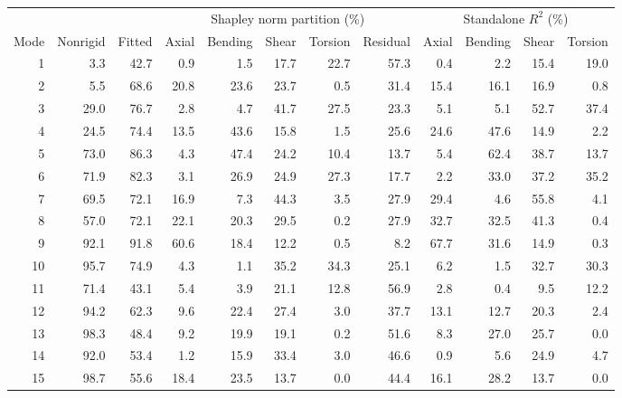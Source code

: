 \begin{tabular}{rrrrrrrrrrrr}
\toprule
 & & & \multicolumn{5}{c}{Shapley norm partition (\%)} & \multicolumn{4}{c}{Standalone $R^2$ (\%)} \\
\cmidrule(lr){4-8} \cmidrule(lr){9-12}
Mode & Nonrigid & Fitted & Axial & Bending & Shear & Torsion & Residual & Axial & Bending & Shear & Torsion \\
\midrule
1 & 3.3 & 42.7 & 0.9 & 1.5 & 17.7 & 22.7 & 57.3 & 0.4 & 2.2 & 15.4 & 19.0 \\
2 & 5.5 & 68.6 & 20.8 & 23.6 & 23.7 & 0.5 & 31.4 & 15.4 & 16.1 & 16.9 & 0.8 \\
3 & 29.0 & 76.7 & 2.8 & 4.7 & 41.7 & 27.5 & 23.3 & 5.1 & 5.1 & 52.7 & 37.4 \\
4 & 24.5 & 74.4 & 13.5 & 43.6 & 15.8 & 1.5 & 25.6 & 24.6 & 47.6 & 14.9 & 2.2 \\
5 & 73.0 & 86.3 & 4.3 & 47.4 & 24.2 & 10.4 & 13.7 & 5.4 & 62.4 & 38.7 & 13.7 \\
6 & 71.9 & 82.3 & 3.1 & 26.9 & 24.9 & 27.3 & 17.7 & 2.2 & 33.0 & 37.2 & 35.2 \\
7 & 69.5 & 72.1 & 16.9 & 7.3 & 44.3 & 3.5 & 27.9 & 29.4 & 4.6 & 55.8 & 4.1 \\
8 & 57.0 & 72.1 & 22.1 & 20.3 & 29.5 & 0.2 & 27.9 & 32.7 & 32.5 & 41.3 & 0.4 \\
9 & 92.1 & 91.8 & 60.6 & 18.4 & 12.2 & 0.5 & 8.2 & 67.7 & 31.6 & 14.9 & 0.3 \\
10 & 95.7 & 74.9 & 4.3 & 1.1 & 35.2 & 34.3 & 25.1 & 6.2 & 1.5 & 32.7 & 30.3 \\
11 & 71.4 & 43.1 & 5.4 & 3.9 & 21.1 & 12.8 & 56.9 & 2.8 & 0.4 & 9.5 & 12.2 \\
12 & 94.2 & 62.3 & 9.6 & 22.4 & 27.4 & 3.0 & 37.7 & 13.1 & 12.7 & 20.3 & 2.4 \\
13 & 98.3 & 48.4 & 9.2 & 19.9 & 19.1 & 0.2 & 51.6 & 8.3 & 27.0 & 25.7 & 0.0 \\
14 & 92.0 & 53.4 & 1.2 & 15.9 & 33.4 & 3.0 & 46.6 & 0.9 & 5.6 & 24.9 & 4.7 \\
15 & 98.7 & 55.6 & 18.4 & 23.5 & 13.7 & 0.0 & 44.4 & 16.1 & 28.2 & 13.7 & 0.0 \\
\bottomrule
\end{tabular}
